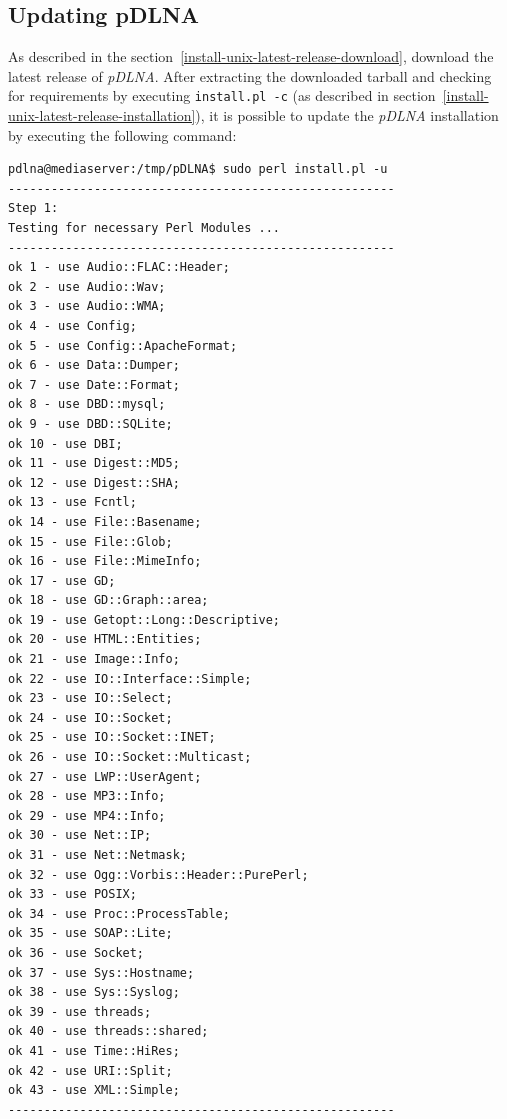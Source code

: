 \documentclass[a4paper,oneside,10pt]{report}
\newenvironment{colframecmd}{%
  \begin{Sbox}
    \begin{minipage}{.99\columnwidth}
}{%
  \end{minipage}
  \end{Sbox}
  \begin{center}
    \fcolorbox{black}{LightSteelBlue}{\TheSbox}
  \end{center}
}
\begin{document}
\subsection{Updating pDLNA}
\label{install-unix-latest-release-updating}

As described in the section~\ref{install-unix-latest-release-download}, download the latest release of {\em pDLNA}. After extracting the downloaded tarball and checking for requirements by executing \verb|install.pl -c| (as described in section~\ref{install-unix-latest-release-installation}), it is possible to update the {\em pDLNA} installation by executing the following command:
\begin{colframecmd}
\begin{verbatim}
pdlna@mediaserver:/tmp/pDLNA$ sudo perl install.pl -u
------------------------------------------------------
Step 1:
Testing for necessary Perl Modules ...
------------------------------------------------------
ok 1 - use Audio::FLAC::Header;
ok 2 - use Audio::Wav;
ok 3 - use Audio::WMA;
ok 4 - use Config;
ok 5 - use Config::ApacheFormat;
ok 6 - use Data::Dumper;
ok 7 - use Date::Format;
ok 8 - use DBD::mysql;
ok 9 - use DBD::SQLite;
ok 10 - use DBI;
ok 11 - use Digest::MD5;
ok 12 - use Digest::SHA;
ok 13 - use Fcntl;
ok 14 - use File::Basename;
ok 15 - use File::Glob;
ok 16 - use File::MimeInfo;
ok 17 - use GD;
ok 18 - use GD::Graph::area;
ok 19 - use Getopt::Long::Descriptive;
ok 20 - use HTML::Entities;
ok 21 - use Image::Info;
ok 22 - use IO::Interface::Simple;
ok 23 - use IO::Select;
ok 24 - use IO::Socket;
ok 25 - use IO::Socket::INET;
ok 26 - use IO::Socket::Multicast;
ok 27 - use LWP::UserAgent;
ok 28 - use MP3::Info;
ok 29 - use MP4::Info;
ok 30 - use Net::IP;
ok 31 - use Net::Netmask;
ok 32 - use Ogg::Vorbis::Header::PurePerl;
ok 33 - use POSIX;
ok 34 - use Proc::ProcessTable;
ok 35 - use SOAP::Lite;
ok 36 - use Socket;
ok 37 - use Sys::Hostname;
ok 38 - use Sys::Syslog;
ok 39 - use threads;
ok 40 - use threads::shared;
ok 41 - use Time::HiRes;
ok 42 - use URI::Split;
ok 43 - use XML::Simple;
------------------------------------------------------
\end{verbatim}
\end{colframecmd}
\end{document}

